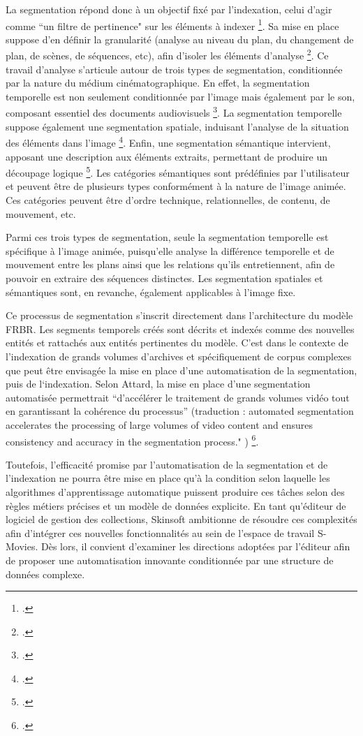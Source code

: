 La segmentation répond donc à un objectif fixé par l’indexation, celui d’agir comme “un filtre de pertinence" sur les éléments à indexer \footcite{stockinger2011}. Sa mise en place suppose d’en définir la granularité (analyse au niveau du plan, du changement de plan, de scènes, de séquences, etc), afin d’isoler les éléments d’analyse \footcite{stockinger2011}. Ce travail d’analyse s’articule autour de trois types de segmentation, conditionnée par la nature du médium cinématographique. En effet, la segmentation temporelle est non seulement conditionnée par l’image mais également par le son, composant essentiel des documents audiovisuels \footcite{carrive2014}. La segmentation temporelle suppose également une segmentation spatiale, induisant l'analyse de la situation des éléments dans l'image \footcite{zhou2022}. Enfin, une segmentation sémantique intervient, apposant une description aux éléments extraits, permettant de produire un découpage logique \footcite{zhou2022}. Les catégories sémantiques sont prédéfinies par l'utilisateur et peuvent être de plusieurs types conformément à la nature de l’image animée. Ces catégories peuvent être d’ordre technique, relationnelles, de contenu, de mouvement, etc.  

Parmi ces trois types de segmentation, seule la segmentation temporelle est spécifique à l'image animée, puisqu'elle analyse la différence temporelle et de mouvement entre les plans ainsi que les relations qu’ils entretiennent, afin de pouvoir en extraire des séquences distinctes. Les segmentation spatiales et sémantiques sont, en revanche, également applicables à l'image fixe. 

Ce processus de segmentation s’inscrit directement dans l’architecture du modèle FRBR. Les segments temporels créés sont décrits et indexés comme des nouvelles entités et rattachés aux entités pertinentes du modèle. C’est dans le contexte de l’indexation de grands volumes d’archives et spécifiquement de corpus complexes que peut être envisagée la mise en place d’une automatisation de la segmentation, puis de l‘indexation. Selon Attard, la mise en place d’une segmentation automatisée permettrait “d’accélérer le traitement de grands volumes vidéo tout en garantissant la cohérence du processus” (traduction : automated segmentation accelerates the processing of large volumes of video content and ensures consistency and accuracy in the segmentation process." ) \footcite{attard2025}. 

Toutefois, l’efficacité promise par l’automatisation de la segmentation et de l’indexation ne pourra être mise en place qu’à la condition selon laquelle les algorithmes d’apprentissage automatique puissent produire ces tâches selon des règles métiers précises et un modèle de données explicite. En tant qu’éditeur de logiciel de gestion des collections, Skinsoft ambitionne de résoudre ces complexités afin d’intégrer ces nouvelles fonctionnalités au sein de l’espace de travail S-Movies. Dès lors, il convient d’examiner les directions adoptées par l’éditeur afin de proposer une automatisation innovante conditionnée par une structure de données complexe.  

